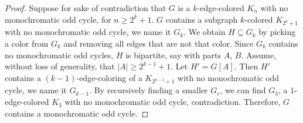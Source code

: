 \documentclass{article}
\newenvironment{problem}[2][Problem]{\begin{trivlist}
\item[\hskip \labelsep {\bfseries #1}\hskip \labelsep {\bfseries #2.}]}{\end{trivlist}}
\begin{document}
\begin{proof}
    Suppose for sake of contradiction that $G$ is a $k$-edge-colored $K_n$ with no monochromatic odd cycle, for $n \geq 2^k + 1$. $G$ contains a subgraph $k$-colored $K_{2^k+1}$ with no monochromatic odd cycle, we name it $G_k$. We obtain $H \subseteq G_k$ by picking a color from $G_k$ and removing all edges that are not that color. Since $G_k$ contains no monochromatic odd cycles, $H$ is bipartite, say with parts $A$, $B$. Assume, without loss of generality, that $|A| \geq 2^{k-1} + 1$. Let $H' = G[A]$. Then $H'$ contains a $(k-1)$-edge-coloring of a $K_{2^{k-1} + 1}$ with no monochromatic odd cycle, we name it $G_{k-1}$. By recursively finding a smaller $G_r$, we can find $G_3$, a $1$-edge-colored $K_3$ with no monochromatic odd cycle, contradiction. Therefore, $G$ contains a monochromatic odd cycle.
\end{proof}


\end{document}
